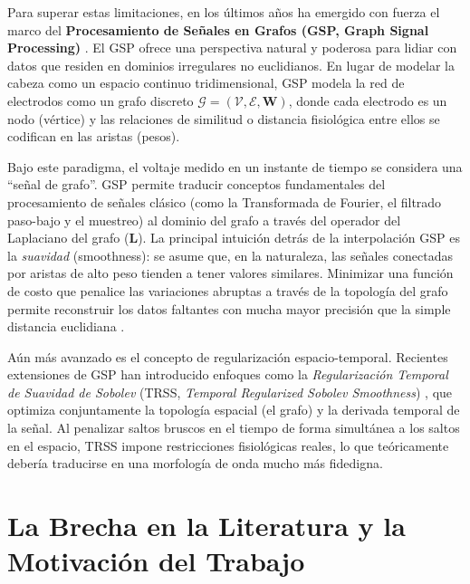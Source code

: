 Para superar estas limitaciones, en los últimos años ha emergido con fuerza el marco del \textbf{Procesamiento de Señales en Grafos (GSP, Graph Signal Processing)} \cite{shuman2013,ortega2018}. El GSP ofrece una perspectiva natural y poderosa para lidiar con datos que residen en dominios irregulares no euclidianos. En lugar de modelar la cabeza como un espacio continuo tridimensional, GSP modela la red de electrodos como un grafo discreto $\mathcal{G} = (\mathcal{V}, \mathcal{E}, \mathbf{W})$, donde cada electrodo es un nodo (vértice) y las relaciones de similitud o distancia fisiológica entre ellos se codifican en las aristas (pesos).

Bajo este paradigma, el voltaje medido en un instante de tiempo se considera una ``señal de grafo''. GSP permite traducir conceptos fundamentales del procesamiento de señales clásico (como la Transformada de Fourier, el filtrado paso-bajo y el muestreo) al dominio del grafo a través del operador del Laplaciano del grafo ($\mathbf{L}$). La principal intuición detrás de la interpolación GSP es la \textit{suavidad} (smoothness): se asume que, en la naturaleza, las señales conectadas por aristas de alto peso tienden a tener valores similares. Minimizar una función de costo que penalice las variaciones abruptas a través de la topología del grafo permite reconstruir los datos faltantes con mucha mayor precisión que la simple distancia euclidiana \cite{narang2013}.

Aún más avanzado es el concepto de regularización espacio-temporal. Recientes extensiones de GSP han introducido enfoques como la \textit{Regularización Temporal de Suavidad de Sobolev} (TRSS, \textit{Temporal Regularized Sobolev Smoothness}) \cite{giraldo2022}, que optimiza conjuntamente la topología espacial (el grafo) y la derivada temporal de la señal. Al penalizar saltos bruscos en el tiempo de forma simultánea a los saltos en el espacio, TRSS impone restricciones fisiológicas reales, lo que teóricamente debería traducirse en una morfología de onda mucho más fidedigna.

\section{La Brecha en la Literatura y la Motivación del Trabajo}

